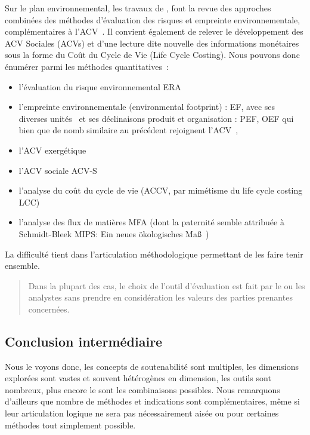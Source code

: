 Sur le plan environnemental, les travaux de \citeauthor{herva_review_2013}, font la revue des approches combinées des méthodes d'évaluation des risques et empreinte environnementale, complémentaires à l'ACV~\cite{herva_review_2013}.
Il convient également de relever le développement des ACV Sociales (ACVs) et d'une lecture dite nouvelle des informations monétaires sous la forme du Coût du Cycle de Vie (Life Cycle Costing).
Nous pouvons donc énumérer parmi les méthodes quantitatives~:
\begin{itemize}
\item l'évaluation du risque environnemental ERA
\item l'empreinte environnementale (environmental footprint) : EF, avec ses diverses unités~\cite{brad_ewing_ecological_2010} et ses déclinaisons produit et organisation : PEF, OEF qui bien que de nomb similaire au précédent rejoignent l'ACV~\cite{commission_europeenne_product_2012},
\item l'ACV exergétique \cite{amini_quantifying_2007, koroneos_exergetic_2014}
\item l'ACV sociale ACV-S \cite{united_nations_environment_programme_guidelines_2009, jorgensen_methodologies_2008}
\item l'analyse du coût du cycle de vie (ACCV, par mimétisme du life cycle costing LCC)~\cite{hunkeler_societal_2006, rebitzer_methodology_2003}
\item l'analyse des flux de matières \gls{MFA} (dont la paternité semble attribuée à Schmidt-Bleek MIPS: Ein neues ökologisches Maß~\cite{schmidt-bleek_mips:_1994})
\end{itemize}
La difficulté tient dans l'articulation méthodologique permettant de les faire tenir ensemble.

\blockcquote[traduction]{gasparatos_embedded_2010}{
Dans la plupart des cas, le choix de l'outil d'évaluation est fait par le ou les analystes sans prendre en considération les valeurs des parties prenantes concernées.
} %
\subsection{Conclusion intermédiaire}
Nous le voyons donc, les concepts de soutenabilité sont multiples, les dimensions explorées sont vastes et souvent hétérogènes en dimension, les outils sont nombreux, plus encore le sont les combinaisons possibles.
Nous remarquons d'ailleurs que nombre de méthodes et indications sont complémentaires, même si leur articulation logique ne sera pas nécessairement aisée ou pour certaines méthodes tout simplement possible.

